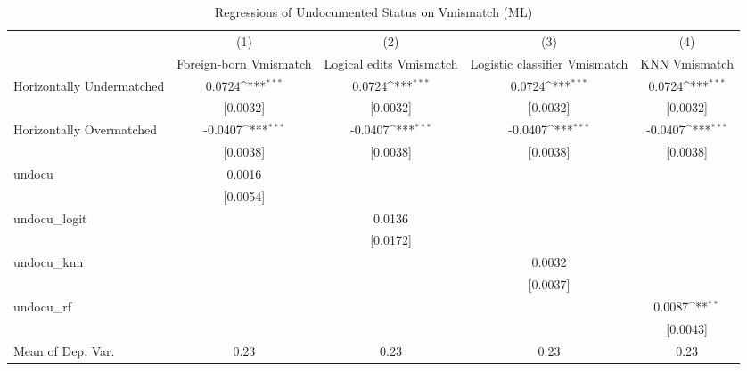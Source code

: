\begin{table}[htbp]\centering
\def\sym#1{\ifmmode^{#1}\else\(^{#1}\)\fi}
\caption{Regressions of Undocumented Status on Vmismatch (ML)}
\begin{tabular}{l*{4}{c}}
\toprule
                    &\multicolumn{1}{c}{(1)}         &\multicolumn{1}{c}{(2)}         &\multicolumn{1}{c}{(3)}         &\multicolumn{1}{c}{(4)}         \\
                    &Foreign-born Vmismatch         &Logical edits Vmismatch         &Logistic classifier Vmismatch         &KNN Vmismatch         \\
\midrule
Horizontally Undermatched&      0.0724\sym{***}&      0.0724\sym{***}&      0.0724\sym{***}&      0.0724\sym{***}\\
                    &    [0.0032]         &    [0.0032]         &    [0.0032]         &    [0.0032]         \\
\addlinespace
Horizontally Overmatched&     -0.0407\sym{***}&     -0.0407\sym{***}&     -0.0407\sym{***}&     -0.0407\sym{***}\\
                    &    [0.0038]         &    [0.0038]         &    [0.0038]         &    [0.0038]         \\
\addlinespace
undocu              &      0.0016         &                     &                     &                     \\
                    &    [0.0054]         &                     &                     &                     \\
\addlinespace
undocu\_logit        &                     &      0.0136         &                     &                     \\
                    &                     &    [0.0172]         &                     &                     \\
\addlinespace
undocu\_knn          &                     &                     &      0.0032         &                     \\
                    &                     &                     &    [0.0037]         &                     \\
\addlinespace
undocu\_rf           &                     &                     &                     &      0.0087\sym{**} \\
                    &                     &                     &                     &    [0.0043]         \\
\midrule
Mean of Dep. Var.   &        0.23         &        0.23         &        0.23         &        0.23         \\

\end{tabular}
\end{table}
